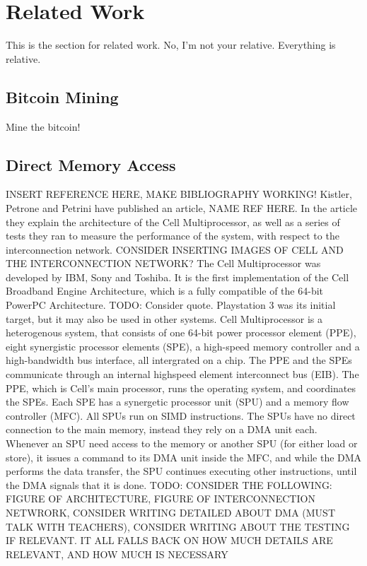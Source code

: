 \chapter{Related Work}
This is the section for related work. 
No, I'm not your relative. 
Everything is relative.

\section{Bitcoin Mining}

Mine the bitcoin!

\section{Direct Memory Access}

INSERT REFERENCE HERE, MAKE BIBLIOGRAPHY WORKING!
Kistler, Petrone and Petrini have published an article, NAME REF HERE. 
In the article they explain the architecture of the Cell Multiprocessor, as well as a series of tests they ran to measure the performance of the system, with respect to the interconnection network.
CONSIDER INSERTING IMAGES OF CELL AND THE INTERCONNECTION NETWORK?
The Cell Multiprocessor was developed by IBM, Sony and Toshiba.
It is the first implementation of the Cell Broadband Engine Architecture, which is a fully compatible of the 64-bit PowerPC Architecture.
TODO: Consider quote.
Playstation 3 was its initial target, but it may also be used in other systems.
Cell Multiprocessor is a heterogenous system, that consists of one 64-bit power processor element (PPE), eight synergistic processor elements (SPE), a high-speed memory controller and a high-bandwidth bus interface, all intergrated on a chip. 
The PPE and the SPEs communicate through an internal highspeed element interconnect bus (EIB).
The PPE, which is Cell's main processor, runs the operating system, and coordinates the SPEs.
Each SPE has a synergetic processor unit (SPU) and a memory flow controller (MFC).
All SPUs run on SIMD instructions.
The SPUs have no direct connection to the main memory, instead they rely on a DMA unit each.
Whenever an SPU need access to the memory or another SPU (for either load or store), it issues a command to its DMA unit inside the MFC, and while the DMA performs the data transfer, the SPU continues executing other instructions, until the DMA signals that it is done.
TODO: CONSIDER THE FOLLOWING: FIGURE OF ARCHITECTURE, FIGURE OF INTERCONNECTION NETWRORK, CONSIDER WRITING DETAILED ABOUT DMA (MUST TALK WITH TEACHERS), CONSIDER WRITING ABOUT THE TESTING IF RELEVANT. IT ALL FALLS BACK ON HOW MUCH DETAILS ARE RELEVANT, AND HOW MUCH IS NECESSARY  